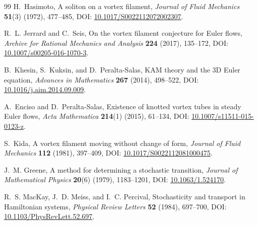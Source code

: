 \documentclass[11pt]{article}
\theoremstyle{definition}
\theoremstyle{plain}
\theoremstyle{remark}
\begin{document}
\begin{thebibliography}{99}
            H.~Hasimoto,
            \newblock A soliton on a vortex filament,
            \newblock \emph{Journal of Fluid Mechanics} \textbf{51}(3) (1972), 477--485,
            \newblock DOI: \href{https://doi.org/10.1017/S0022112072002307}{10.1017/S0022112072002307}.

            R.~L. Jerrard and C.~Seis,
            \newblock On the vortex filament conjecture for Euler flows,
            \newblock \emph{Archive for Rational Mechanics and Analysis} \textbf{224} (2017), 135--172,
            \newblock DOI: \href{https://doi.org/10.1007/s00205-016-1070-3}{10.1007/s00205-016-1070-3}.

            B.~Khesin, S.~Kuksin, and D.~Peralta-Salas,
            \newblock KAM theory and the 3D Euler equation,
            \newblock \emph{Advances in Mathematics} \textbf{267} (2014), 498--522,
            \newblock DOI: \href{https://doi.org/10.1016/j.aim.2014.09.009}{10.1016/j.aim.2014.09.009}.

            A.~Enciso and D.~Peralta-Salas,
            \newblock Existence of knotted vortex tubes in steady Euler flows,
            \newblock \emph{Acta Mathematica} \textbf{214}(1) (2015), 61--134,
            \newblock DOI: \href{https://doi.org/10.1007/s11511-015-0123-z}{10.1007/s11511-015-0123-z}.

            S.~Kida,
            \newblock A vortex filament moving without change of form,
            \newblock \emph{Journal of Fluid Mechanics} \textbf{112} (1981), 397--409,
            \newblock DOI: \href{https://doi.org/10.1017/S0022112081000475}{10.1017/S0022112081000475}.

            J.~M. Greene,
            \newblock A method for determining a stochastic transition,
            \newblock \emph{Journal of Mathematical Physics} \textbf{20}(6) (1979), 1183--1201,
            \newblock DOI: \href{https://doi.org/10.1063/1.524170}{10.1063/1.524170}.

            R.~S. MacKay, J.~D. Meiss, and I.~C. Percival,
            \newblock Stochasticity and transport in Hamiltonian systems,
            \newblock \emph{Physical Review Letters} \textbf{52} (1984), 697--700,
            \newblock DOI: \href{https://doi.org/10.1103/PhysRevLett.52.697}{10.1103/PhysRevLett.52.697}.


\end{thebibliography}
\end{document}
